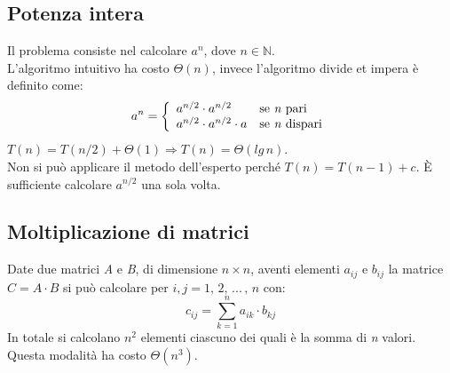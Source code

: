 \documentclass[10pt, a4paper]{report}
\begin{document}
\subsection{Potenza intera}
Il problema consiste nel calcolare $a^n$, dove $n \in \mathbb{N}$.\\L'algoritmo intuitivo ha costo $\Theta(n)$, invece l'algoritmo divide et impera è definito come:
\begin{equation*}
a^n = \left\{
\begin{array}{ll}
a^{n/2} \cdot a^{n/2}  & \text{se \textit{n} pari} \\
a^{n/2} \cdot a^{n/2} \cdot a & \text{se \textit{n} dispari}
\end{array}\right.
\end{equation*}
$T(n) = T(n/2) + \Theta(1) \Rightarrow T(n) = \Theta(lg\,n)$.\\Non si può applicare il metodo dell'esperto perché $T(n)=T(n - 1) + c$. È sufficiente calcolare $a^{n/2}$ una sola volta.
\subsection{Moltiplicazione di matrici}
Date due matrici \textit{A} e \textit{B}, di dimensione $n \times n$, aventi elementi $a_{ij}$ e $b_{ij}$ la matrice $C = A \cdot B$ si può calcolare per $i,j = 1,\,2,\,...\,,\,n$ con:
\begin{equation*}
c_{ij} = \sum_{k=1}^{n}a_{ik}\cdot b_{kj}
\end{equation*}
In totale si calcolano $n^2$ elementi ciascuno dei quali è la somma di \textit{n} valori. Questa modalità ha costo $\Theta(n^3)$. 
\end{document}
